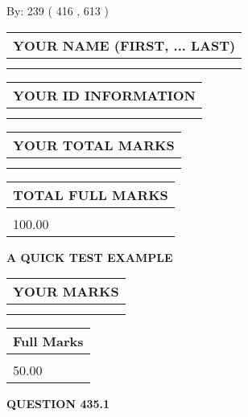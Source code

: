 \documentclass[12pt]{article}
\begin{document}
   
\hspace{1.0in} By: 
 239 ( 416 ,  613 )
   
   
   
   
\newpage 
\setcounter{page}{ 
   435001 } 
   
   
   
   
\noindent\begin{tabular}{|l|}
\hline
YOUR NAME (FIRST, ... LAST)  \\
\hline
 \\ 
 \\ 
\hline
\end{tabular}
\hspace{0.05in} \begin{tabular}{|l|}
\hline
 YOUR   ID   INFORMATION  \\
\hline
 \\ 
 \\ 
\hline
\end{tabular}
   
   
\vspace{0.2in}\noindent\begin{tabular}{|l|}
\hline
YOUR TOTAL MARKS  \\
\hline
 \\ 
 \\ 
\hline
\end{tabular}
\hspace{0.05in} \begin{tabular}{|l|}
\hline
TOTAL FULL MARKS  \\
\hline
 \\ 
100.00 \\
\hline
\end{tabular}
   
   
 \vspace{0.2in}
{\LARGE {\textbf{ A QUICK TEST EXAMPLE}}}
   
   
  
\vspace{0.2in}
  
\noindent\begin{tabular}{|l|}
\hline
 YOUR MARKS  \\
\hline
 \\ 
 \\ 
\hline
\end{tabular}
\hspace{0.05in} \begin{tabular}{|l|}
\hline
 Full Marks  \\
\hline
 \\ 
50.00 \\
\hline
\end{tabular}
{\textbf{\Large{QUESTION
435.1 
}}}
  
\end{document}

